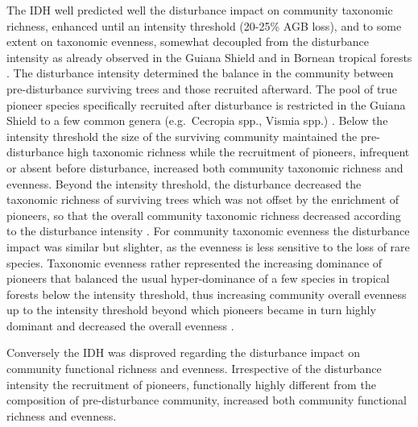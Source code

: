 \documentclass[
  11pt,
  french,
  A4paper,
  extrafontsizes,onecolumn,openright
  ]{memoir}
\begin{document}
The IDH well predicted well the disturbance impact on community
taxonomic richness, enhanced until an intensity threshold (20-25\% AGB
loss), and to some extent on taxonomic evenness, somewhat decoupled from
the disturbance intensity as already observed in the Guiana Shield
\autocite{Baraloto2012a} and in Bornean tropical forests
\autocite{Cannon1998}. The disturbance intensity determined the balance
in the community between pre-disturbance surviving trees and those
recruited afterward. The pool of true pioneer species specifically
recruited after disturbance is restricted in the Guiana Shield to a few
common genera (e.g.~Cecropia spp., Vismia spp.) \autocite{Guitet2018}.
Below the intensity threshold the size of the surviving community
maintained the pre-disturbance high taxonomic richness while the
recruitment of pioneers, infrequent or absent before disturbance,
increased both community taxonomic richness and evenness. Beyond the
intensity threshold, the disturbance decreased the taxonomic richness of
surviving trees which was not offset by the enrichment of pioneers, so
that the overall community taxonomic richness decreased according to the
disturbance intensity \autocite{Molino2001}. For community taxonomic
evenness the disturbance impact was similar but slighter, as the
evenness is less sensitive to the loss of rare species. Taxonomic
evenness rather represented the increasing dominance of pioneers that
balanced the usual hyper-dominance of a few species in tropical forests
below the intensity threshold, thus increasing community overall
evenness up to the intensity threshold beyond which pioneers became in
turn highly dominant and decreased the overall evenness
\autocite{Baraloto2012a}.

Conversely the IDH was disproved regarding the disturbance impact on
community functional richness and evenness. Irrespective of the
disturbance intensity the recruitment of pioneers, functionally highly
different from the composition of pre-disturbance community, increased
both community functional richness and evenness.
\end{document}
